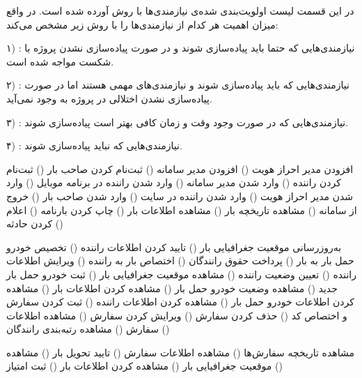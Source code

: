 
در این قسمت لیست اولویت‌بندی شده‌ی نیازمندی‌ها با روش  آورده شده است. در واقع  میزان اهمیت هر کدام از نیازمندی‌ها را با روش زیر مشخص می‌کند:

۱) : نیازمندی‌هایی که حتما باید پیاده‌سازی شوند و در صورت پیاده‌سازی نشدن پروژه با شکست مواجه شده است.

۲) : نیازمندی‌هایی که باید پیاده‌سازی شوند و نیازمندی‌های مهمی هستند اما در صورت پیاده‌سازی نشدن اختلالی در پروژه به وجود نمی‌آید.

۳) : نیازمندی‌هایی که در صورت وجود وقت و زمان کافی بهتر است پیاده‌سازی شوند.

۴) : نیازمندی‌هایی که نباید پیاده‌سازی شوند.

	 
		 افزودن مدیر احراز هویت ()
		 افزودن مدیر سامانه ()
		 ثبت‌نام کردن صاحب بار ()
		 ثبت‌نام کردن راننده ()
		 وارد شدن مدیر سامانه ()
		 وارد شدن راننده در برنامه موبایل ()
		 وارد شدن مدیر احراز هویت ()
		 وارد شدن راننده در سایت ()
		 وارد شدن صاحب بار ()
		 خروج از سامانه ()
	 
		 مشاهده تاریخچه بار ()
		 مشاهده اطلاعات بار ()
		 چاپ کردن بارنامه ()
		 اعلام کردن حادثه ()
	
	 
		 به‌روزرسانی موقعیت جغرافیایی بار ()
	 
		 تایید کردن اطلاعات راننده ()
		 تخصیص خودرو حمل بار به بار ()
		 پرداخت حقوق رانندگان ()
		 اختصاص بار به راننده ()
		 ویرایش اطلاعات راننده ()
		 تعیین وضعیت راننده		 ()
		 مشاهده موقعیت جغرافیایی بار ()
		 ثبت خودرو حمل بار جدید ()
		 مشاهده وضعیت خودرو حمل بار ()
		 مشاهده کردن اطلاعات بار ()
		 مشاهده کردن اطلاعات خودرو حمل بار ()
		 مشاهده کردن اطلاعات راننده ()
		 ثبت کردن سفارش و اختصاص کد ()
		 حذف کردن سفارش ()
		 ویرایش کردن سفارش ()
		 مشاهده اطلاعات سفارش ()
		 مشاهده رتبه‌بندی رانندگان ()
		
	 
		 مشاهده تاریخچه سفارش‌ها ()
		 مشاهده اطلاعات سفارش ()
		 تایید تحویل بار ()
		 مشاهده موقعیت جغرافیایی بار ()
		 مشاهده کردن اطلاعات بار ()
		 ثبت امتیاز ()
